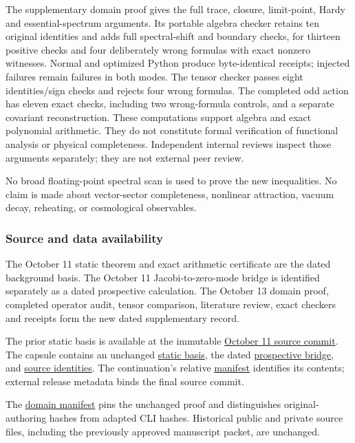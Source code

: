 \documentclass[
  11pt,
]{article}
\begin{document}
The supplementary domain proof gives the full trace, closure,
limit-point, Hardy and essential-spectrum arguments. Its portable
algebra checker retains ten original identities and adds full
spectral-shift and boundary checks, for thirteen positive checks and
four deliberately wrong formulas with exact nonzero witnesses. Normal
and optimized Python produce byte-identical receipts; injected failures
remain failures in both modes. The tensor checker passes eight
identities/sign checks and rejects four wrong formulas. The completed
odd action has eleven exact checks, including two wrong-formula
controls, and a separate covariant reconstruction. These computations
support algebra and exact polynomial arithmetic. They do not constitute
formal verification of functional analysis or physical completeness.
Independent internal reviews inspect those arguments separately; they
are not external peer review.

No broad floating-point spectral scan is used to prove the new
inequalities. No claim is made about vector-sector completeness,
nonlinear attraction, vacuum decay, reheating, or cosmological
observables.

\subsubsection{Source and data
availability}\label{source-and-data-availability}

The October 11 static theorem and exact arithmetic certificate are the
dated background basis. The October 11 Jacobi-to-zero-mode bridge is
identified separately as a dated prospective calculation. The October 13
domain proof, completed operator audit, tensor comparison, literature
review, exact checkers and receipts form the new dated supplementary
record.

The prior static basis is available at the immutable
\href{https://github.com/maldonado-research/HDblast/tree/ca001b58b73ca45117e3849f74ac241489583c66/research/HDBLAST_SCALAR_RESPONSE_MONOTONICITY_20261011}{October
11 source commit}. The capsule contains an unchanged
\href{../basis/static/README.md}{static basis}, the dated
\href{../basis/bridge/PROSPECTIVE_ZERO_MODE_STRATEGY.md}{prospective
bridge}, and \href{../basis/SOURCE_IDENTITIES.json}{source identities}.
The continuation's relative \href{../MANIFEST.json}{manifest} identifies
its contents; external release metadata binds the final source commit.

The \href{../domain/PORTABLE_MANIFEST.json}{domain manifest} pins the
unchanged proof and distinguishes original-authoring hashes from adapted
CLI hashes. Historical public and private source files, including the
previously approved manuscript packet, are unchanged.
\end{document}
